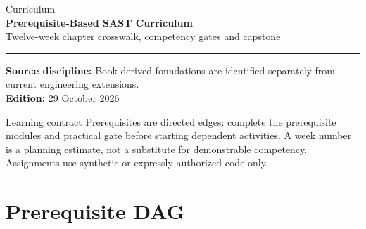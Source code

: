 \documentclass[10pt,letterpaper]{article}
\begin{document}
\hypersetup{pageanchor=false}%
\begin{titlepage}
\vspace*{1.0in}
{\color{bluegray}\Large Curriculum}\\[1.0em]
{\color{navy}\Huge\bfseries Prerequisite-Based SAST Curriculum}\\[0.7em]
{\Large Twelve-week chapter crosswalk, competency gates and capstone}\\[2.0em]
\rule{\linewidth}{1.0pt}
\vfill
\textbf{Source discipline:} Book-derived foundations are identified separately from current engineering extensions.\\
\textbf{Edition:} 29 October 2026
\end{titlepage}\hypersetup{pageanchor=true}
\tableofcontents
\clearpage
\begin{focusbox}{Learning contract}
Prerequisites are directed edges: complete the prerequisite modules and practical gate before starting dependent activities. A week number is a planning estimate, not a substitute for demonstrable competency. Assignments use synthetic or expressly authorized code only.
\end{focusbox}
\section{Prerequisite DAG}
\begin{center}
\end{center}
\end{document}
